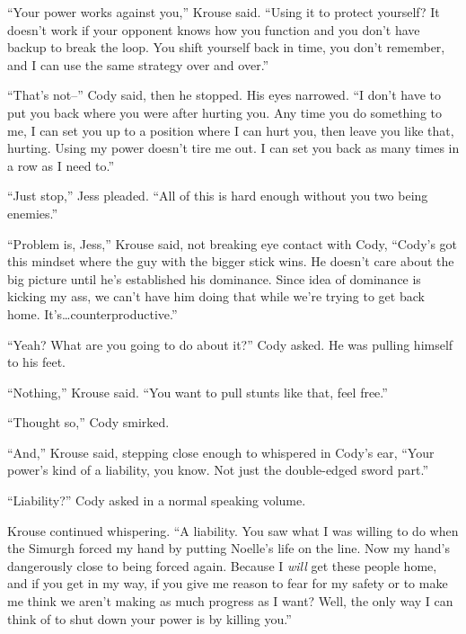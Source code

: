 ``Your power works against you,'' Krouse said.  ``Using it to protect yourself?  It doesn't work if your opponent knows how you function and you don't have backup to break the loop.  You shift yourself back in time, you don't remember, and I can use the same strategy over and over.''



``That's not--'' Cody said, then he stopped.  His eyes narrowed.  ``I don't have to put you back where you were after hurting you.  Any time you do something to me, I can set you up to a position where I can hurt you, then leave you like that, hurting.  Using my power doesn't tire me out.  I can set you back as many times in a row as I need to.''



``Just stop,'' Jess pleaded.  ``All of this is hard enough without you two being enemies.''



``Problem is, Jess,'' Krouse said, not breaking eye contact with Cody, ``Cody's got this mindset where the guy with the bigger stick wins. He doesn't care about the big picture until he's established his dominance.  Since idea of dominance is kicking my ass, we can't have him doing that while we're trying to get back home.  It's\ldots counterproductive.''



``Yeah?  What are you going to do about it?'' Cody asked.  He was pulling himself to his feet.



``Nothing,'' Krouse said.  ``You want to pull stunts like that, feel free.''



``Thought so,'' Cody smirked.



``And,'' Krouse said, stepping close enough to whispered in Cody's ear, ``Your power's kind of a liability, you know. Not just the double-edged sword part.''



``Liability?''  Cody asked in a normal speaking volume.



Krouse continued whispering.  ``A liability.  You saw what I was willing to do when the Simurgh forced my hand by putting Noelle's life on the line.  Now my hand's dangerously close to being forced again.  Because I \emph{will} get these people home, and if you get in my way, if you give me reason to fear for my safety or to make me think we aren't making as much progress as I want?  Well, the only way I can think of to shut down your power is by killing you.''



